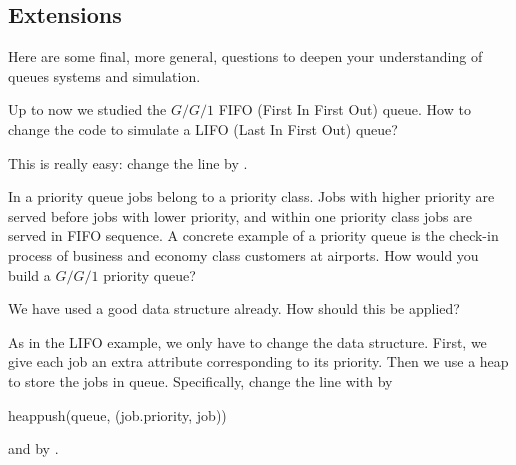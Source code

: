 \subsection{Extensions}
\label{sec:extensions}

Here are some final, more general, questions to deepen your understanding of queues systems and simulation. 

\begin{exercise}
  Up to now we studied the $G/G/1$ FIFO (First In First Out) queue. How to change the code to simulate a LIFO (Last In First Out) queue?
  \begin{solution}
    This is really easy: change the line  by  . 
 \end{solution}
\end{exercise}

\begin{exercise}
  In a priority queue  jobs belong to a priority class. Jobs with higher priority are served before jobs with lower priority, and within one priority class jobs are served in FIFO sequence. A concrete example of a priority queue is the check-in process of business and economy class customers at airports.  How would you build a $G/G/1$ priority queue?
  \begin{hint}
We have used a good data structure already. How should this be applied?
  \end{hint}
\begin{solution}
  As in the LIFO example, we only have to change the data structure. First, we give each job an extra attribute corresponding to its priority. Then we use a heap to store the jobs in queue. Specifically,  change the line with
   by
  \begin{pyverbatim}
heappush(queue, (job.priority, job))
  \end{pyverbatim}
and  by . 

\end{solution}
\end{exercise}

